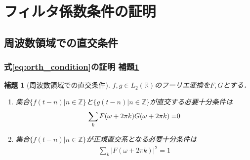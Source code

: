 \documentclass[dvipdfmx,graphicx,14pt]{beamer}
\newcommand{\roverline}[1]{\mathpalette\doroverline{#1}}
\newcommand{\doroverline}[2]{\overline{#1#2}}
\newtheorem{mylemma}{補題}
\begin{document}
\section{フィルタ係数条件の証明}

\subsection{周波数領域での直交条件}

\begin{frame}[c]
    \frametitle{式\eqref{eq:orth_condition}の証明 補題\ref{lem:orth_condition_in_freq}}
    \begin{mylemma}[周波数領域での直交条件] 
        $f,g \in L_{2}(\mathbb{R})$のフーリエ変換を$F, G$とする．
        \label{lem:orth_condition_in_freq}
        \begin{enumerate}
            \item 集合$\{ f(t - n) | n \in \mathbb{Z} \}$と$\{ g(t - n) | n \in \mathbb{Z} \}$が直交する必要十分条件は
                \begin{align}
                    \sum_{k} F(\omega + 2\pi k) \roverline{G(\omega + 2\pi k)} = 0
                \end{align}
            \item 集合$\{ f(t - n) | n \in \mathbb{Z} \}$が正規直交系となる必要十分条件は
                \begin{align}
                    \sum_{k} |F(\omega + 2\pi k)|^{2} = 1
                \end{align}
        \end{enumerate}
    \end{mylemma}
\end{frame}
\end{document}
